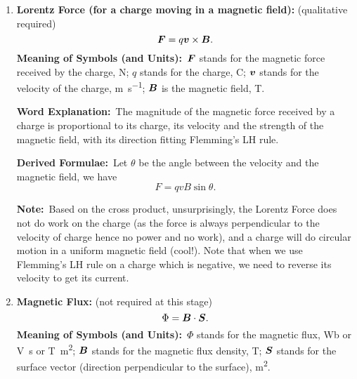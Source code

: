 \documentclass[8pt]{article}
\newcommand{\MeanSymb}{\textbf{Meaning of Symbols (and Units):}\ }
\newcommand{\WordExpl}{\textbf{Word Explanation:}\ }
\newcommand{\DeriForm}{\textbf{Derived Formulae:}\ }
\newcommand{\Note}{\textbf{Note:}\ }
\begin{document}
\begin{enumerate}
                \WordExpl The magnitude of the force the current-carrying wire receives is proportional to the strength of the magnetic field, the current and its length, and its direction will satisfy Flemming's LH rule (cross product).

                \DeriForm Let \(\theta\) be the angle between the wire and the magnetic field, we have
                \[
                    F = BIl \sin \theta.
                \]

                \Note This is cool, and this could be used to define the \(\vect{B}\) field. The cross product simply represents the direction without the need to use the Cartesian coordinate formed by Flemming's LH rule.

                \item \textbf{Lorentz Force (for a charge moving in a magnetic field):} (qualitative required)
                \[
                    \boldsymbol{F} = q\boldsymbol{v} \times \boldsymbol{B}.
                \]
                \MeanSymb \(\boldsymbol{F}\) stands for the magnetic force received by the charge, \unit{\newton}; \(q\) stands for the charge, \unit{\coulomb}; \(\boldsymbol{v}\) stands for the velocity of the charge, \unit{\metre\per\second}; \(\vect{B}\) is the magnetic field, \unit{\tesla}.

                \WordExpl The magnitude of the magnetic force received by a charge is proportional to its charge, its velocity and the strength of the magnetic field, with its direction fitting Flemming's LH rule.

                \DeriForm Let \(\theta\) be the angle between the velocity and the magnetic field, we have
                \[
                    F = qvB \sin \theta.
                \]

                \Note Based on the cross product, unsurprisingly, the Lorentz Force does not do work on the charge (as the force is always perpendicular to the velocity of charge hence no power and no work), and a charge will do circular motion in a uniform magnetic field (cool!). Note that when we use Flemming's LH rule on a charge which is negative, we need to reverse its velocity to get its current.

                \item \textbf{Magnetic Flux:} (not required at this stage)
                \[
                    \Phi = \boldsymbol{B} \cdot \boldsymbol{S}.
                \]
                \MeanSymb \(\Phi\) stands for the magnetic flux, \unit{\weber} or \unit{\volt \second} or \unit{\tesla \metre \squared}; \(\vect{B}\) stands for the magnetic flux density, \unit{\tesla}; \(\boldsymbol{S}\) stands for the surface vector (direction perpendicular to the surface), \unit{\metre\squared}.


\end{enumerate}
\end{document}
